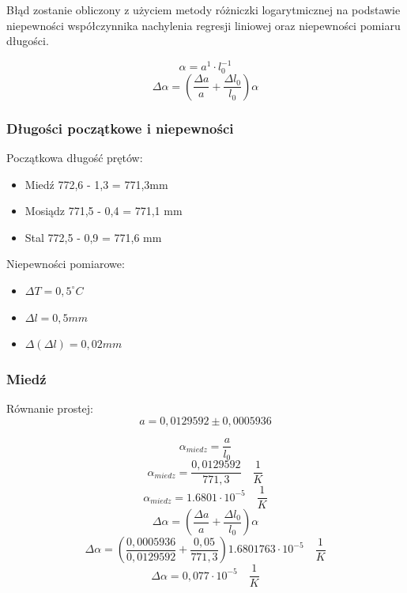 \documentclass[a4paper, 11pt]{article}
\begin{document}
Błąd zostanie obliczony z użyciem  metody różniczki logarytmicznej na podstawie
niepewności współczynnika nachylenia regresji liniowej oraz niepewności pomiaru długości.

\[
	\alpha = a^1 \cdot l_0^{-1}
\]
\[
	\Delta \alpha = \left( \frac{\Delta a}{a} + \frac{\Delta l_0}{l_0} \right) \alpha
\]

\subsubsection{Długości początkowe i niepewności}

\begin{multicols}{2}

	Początkowa długość prętów:
	\begin{itemize}
		\item Miedź 772,6 - 1,3 = 771,3mm
		\item Mosiądz 771,5 - 0,4 = 771,1 mm
		\item Stal 772,5 - 0,9 = 771,6 mm
	\end{itemize}

	\columnbreak

	Niepewności pomiarowe:
	\begin{itemize}
		\item $ \Delta T = 0,5^{\circ}C$
		\item $ \Delta l = 0,5mm $
		\item $ \Delta(\Delta l) = 0,02mm  $
	\end{itemize}

\end{multicols}

\subsubsection{Miedź}\label{sub:miedz} %
Równanie prostej:
\[
	a = 0,0129592 \pm 0,0005936
\]
\begin{multicols}{2}
	\[
		\alpha_{miedz} = \frac{a}{l_0}
	\]
	\[
		\alpha_{miedz} = \frac{0,0129592}{771,3} \quad \frac{1}{K}
	\]
	\[
		\alpha_{miedz} = 1.6801 \cdot 10^{-5} \quad \frac{1}{K}
	\]
	\columnbreak
	\[
		\Delta \alpha = \left( \frac{\Delta a}{a} + \frac{\Delta l_0}{l_0} \right) \alpha
	\]
	\[
		\Delta \alpha = \left( \frac{0,0005936}{0,0129592} + \frac{0,05}{771,3} \right) 1.6801763 \cdot 10^{-5}\quad \frac{1}{K}
	\]
	\[
		\Delta \alpha = 0,077 \cdot 10^{-5}\quad \frac{1}{K}
	\]
\end{multicols}
\end{document}
